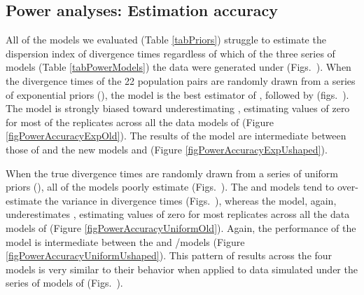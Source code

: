 \subsection*{Power analyses: Estimation accuracy}
All of the models we evaluated (Table \ref{tabPriors}) struggle to estimate the
dispersion index of divergence times \divTimeDispersion regardless of which of
the three series of models (Table \ref{tabPowerModels}) the data were generated
under (Figs.\
).
When the divergence times of the 22 population pairs are randomly drawn from a
series of exponential priors (\powerSeriesExp), the \modelDPP model is the
best estimator of \divTimeDispersion, followed by \modelUniform (figs.\
).
The \modelOld model is strongly biased toward underestimating
\divTimeDispersion, estimating values of zero for most of the replicates across
all the data models of \powerSeriesExp (Figure \ref{figPowerAccuracyExpOld}).
The results of the \modelUshaped model are intermediate between those of
\modelOld and the new models \modelDPP and \modelUniform
(Figure \ref{figPowerAccuracyExpUshaped}).

When the true divergence times are randomly drawn from a series of uniform
priors (\powerSeriesUniform), all of the models poorly estimate
\divTimeDispersion (Figs.\
).
The \modelDPP and \modelUniform models tend to over-estimate the variance in
divergence times (Figs.\
), whereas
the \modelOld model, again, underestimates \divTimeDispersion, estimating
values of zero for most replicates across all the data models of
\powerSeriesUniform (Figure \ref{figPowerAccuracyUniformOld}).
Again, the performance of the \modelUshaped model is intermediate between the
\modelOld and \modelDPP/\modelUniform models (Figure
\ref{figPowerAccuracyUniformUshaped}).
This pattern of results across the four models is very similar to their
behavior when applied to data simulated under the series of models of
\powerSeriesOld (Figs.\
).

